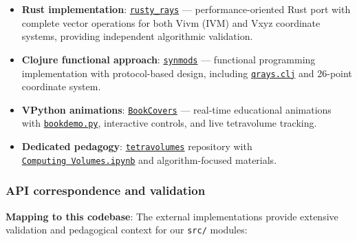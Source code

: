 \documentclass[
  10pt,
]{article}
\begin{document}
\begin{itemize}
\item
  \textbf{Rust implementation}:
  \href{https://github.com/4dsolutions/rusty_rays}{\texttt{rusty\_rays}}
  --- performance-oriented Rust port with complete vector operations for
  both Vivm (IVM) and Vxyz coordinate systems, providing independent
  algorithmic validation.
\item
  \textbf{Clojure functional approach}:
  \href{https://github.com/4dsolutions/synmods}{\texttt{synmods}} ---
  functional programming implementation with protocol-based design,
  including
  \href{https://github.com/4dsolutions/synmods/blob/master/qrays.clj}{\texttt{qrays.clj}}
  and 26-point coordinate system.
\item
  \textbf{VPython animations}:
  \href{https://github.com/4dsolutions/BookCovers}{\texttt{BookCovers}}
  --- real-time educational animations with
  \href{https://github.com/4dsolutions/BookCovers/blob/master/bookdemo.py}{\texttt{bookdemo.py}},
  interactive controls, and live tetravolume tracking.
\item
  \textbf{Dedicated pedagogy}:
  \href{https://github.com/4dsolutions/tetravolumes}{\texttt{tetravolumes}}
  repository with
  \href{https://raw.githubusercontent.com/4dsolutions/tetravolumes/refs/heads/master/Computing\%20Volumes.ipynb}{\texttt{Computing\ Volumes.ipynb}}
  and algorithm-focused materials.
\end{itemize}

\hypertarget{api-correspondence-and-validation}{%
\subsubsection{API correspondence and
validation}\label{api-correspondence-and-validation}}

\textbf{Mapping to this codebase}: The external implementations provide
extensive validation and pedagogical context for our \texttt{src/}
modules:
\end{document}
